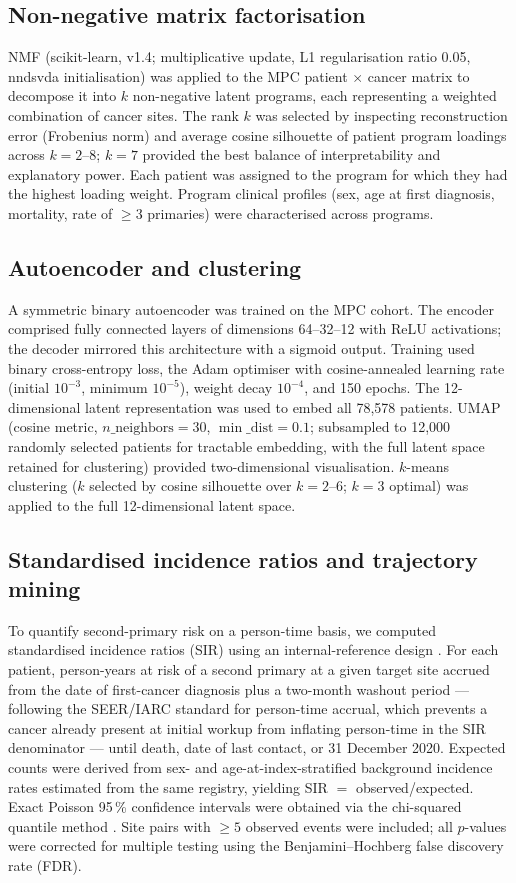 \documentclass[review,12pt]{elsarticle}
\begin{document}
\subsection{Non-negative matrix factorisation}
NMF (scikit-learn, v1.4; multiplicative update, L1 regularisation ratio 0.05,
nndsvda initialisation) was applied to the MPC patient $\times$ cancer matrix to
decompose it into $k$ non-negative latent programs, each representing a weighted
combination of cancer sites. The rank $k$ was selected by inspecting
reconstruction error (Frobenius norm) and average cosine silhouette of patient
program loadings across $k = 2$--8; $k = 7$ provided the best balance of
interpretability and explanatory power. Each patient was assigned to the program
for which they had the highest loading weight. Program clinical profiles
(sex, age at first diagnosis, mortality, rate of $\geq 3$ primaries) were
characterised across programs.

\subsection{Autoencoder and clustering}
A symmetric binary autoencoder was trained on the MPC cohort. The encoder
comprised fully connected layers of dimensions 64--32--12 with ReLU activations;
the decoder mirrored this architecture with a sigmoid output. Training used
binary cross-entropy loss, the Adam optimiser with cosine-annealed learning rate
(initial $10^{-3}$, minimum $10^{-5}$), weight decay $10^{-4}$, and 150 epochs.
The 12-dimensional latent representation was used to embed all 78,578 patients.
UMAP (cosine metric, $n\_\text{neighbors} = 30$, $\min\_\text{dist} = 0.1$;
subsampled to 12,000 randomly selected patients for tractable embedding, with
the full latent space retained for clustering) provided two-dimensional
visualisation. $k$-means clustering ($k$ selected by cosine silhouette over
$k = 2$--6; $k = 3$ optimal) was applied to the full 12-dimensional latent
space.

\subsection{Standardised incidence ratios and trajectory mining}
To quantify second-primary risk on a person-time basis, we computed
standardised incidence ratios (SIR) using an internal-reference design
\cite{Breslow1987}. For each patient, person-years at risk of a second primary
at a given target site accrued from the date of first-cancer diagnosis plus a
two-month washout period --- following the SEER/IARC standard for person-time
accrual, which prevents a cancer already present at initial workup from
inflating person-time in the SIR denominator --- until death, date of last
contact, or 31 December 2020. Expected counts were derived from sex- and
age-at-index-stratified background incidence rates estimated from the same
registry, yielding SIR $=$ observed/expected. Exact Poisson 95\,\% confidence
intervals were obtained via the chi-squared quantile method \cite{Breslow1987}.
Site pairs with $\geq 5$ observed events were included; all $p$-values were
corrected for multiple testing using the Benjamini--Hochberg false discovery
rate (FDR).
\end{document}
